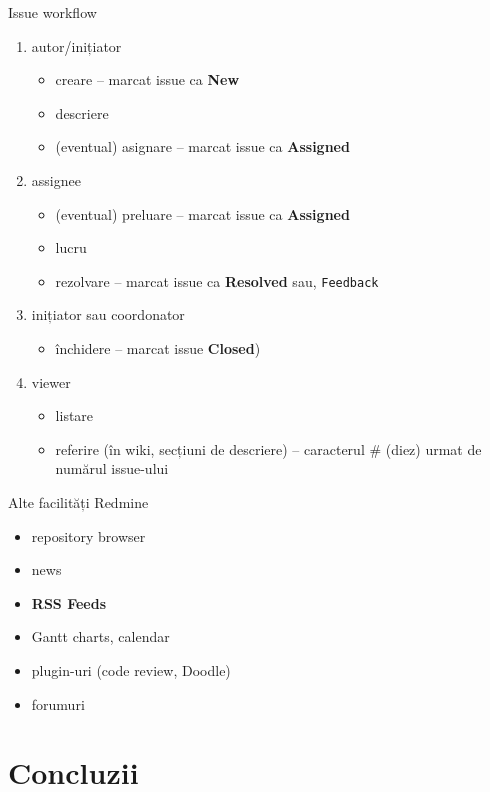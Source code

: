 \documentclass{beamer}
\begin{document}
\begin{frame}{Issue workflow}
  \begin{enumerate}
    \item autor/inițiator
      \begin{itemize}
        \item creare -- marcat issue ca \textbf{New}
        \item descriere
        \item (eventual) asignare -- marcat issue ca \textbf{Assigned}
      \end{itemize}
    \item assignee
      \begin{itemize}
        \item (eventual) preluare -- marcat issue ca \textbf{Assigned}
        \item lucru
        \item rezolvare -- marcat issue ca \textbf{Resolved} sau,
        \texttt{Feedback}
      \end{itemize}
    \item inițiator sau coordonator
      \begin{itemize}
        \item închidere -- marcat issue \textbf{Closed})
      \end{itemize}
    \item viewer
      \begin{itemize}
        \item listare
        \item referire (în wiki, secțiuni de descriere) -- caracterul \# (diez) urmat de numărul issue-ului
      \end{itemize}
  \end{enumerate}
\end{frame}

\begin{frame}{Alte facilități Redmine}
  \begin{itemize}
    \item repository browser
    \item news
    \item \textbf{RSS Feeds}
    \item Gantt charts, calendar
    \item plugin-uri (code review, Doodle)
    \item forumuri
  \end{itemize}
\end{frame}

\section{Concluzii}
\end{document}
